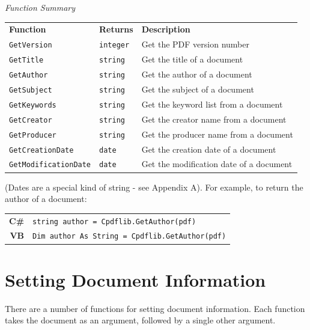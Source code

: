 \documentclass[a4paper]{memoir}
\begin{document}
\begin{framed}
\noindent\textit{Function Summary}\\[2mm]
\noindent\begin{tabular}{lll}
\textbf{Function} & \textbf{Returns} & \textbf{Description}\\
\verb!GetVersion! & \verb!integer! & Get the PDF version number\\
\verb!GetTitle! & \verb!string! & Get the title of a document\\
\verb!GetAuthor! & \verb!string! & Get the author of a document\\
\verb!GetSubject! & \verb!string! & Get the subject of a document\\
\verb!GetKeywords! & \verb!string! & Get the keyword list from a document\\
\verb!GetCreator! & \verb!string! & Get the creator name from a document\\
\verb!GetProducer! & \verb!string! & Get the producer name from a document\\
\verb!GetCreationDate! & \verb!date! & Get the creation date of a document\\
\verb!GetModificationDate! & \verb!date!& Get the modification date of a document
\end{tabular}
\end{framed}
\noindent(Dates are a special kind of string - see Appendix A). For example, to return the author of a document:
\begin{framed}
\noindent\begin{tabular}{rl}
\small\sffamily\textbf{C\#} &
\begin{minipage}{4in}
\small\verb!string author = Cpdflib.GetAuthor(pdf)!
\end{minipage}\\[5mm]
\small\sffamily\textbf{VB} &
\begin{minipage}{4in}
\small\verb!Dim author As String = Cpdflib.GetAuthor(pdf)!
\end{minipage}\\[5mm]
\end{tabular}
\end{framed}

\section{Setting Document Information}
There are a number of functions for setting document information. Each function takes the document as an argument, followed by a single other argument.
\end{document}
